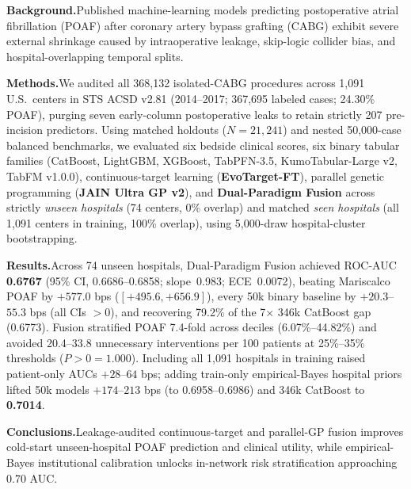\begin{nejmabstract}
\noindent\textbf{Background.}\hspace{0.4em}Published machine-learning models predicting postoperative atrial fibrillation (POAF) after coronary artery bypass grafting (CABG) exhibit severe external shrinkage caused by intraoperative leakage, skip-logic collider bias, and hospital-overlapping temporal splits.

\smallskip\noindent\textbf{Methods.}\hspace{0.4em}We audited all 368,132 isolated-CABG procedures across 1,091 U.S.\ centers in STS ACSD v2.81 (2014--2017; 367,695 labeled cases; 24.30\% POAF), purging seven early-column postoperative leaks to retain strictly 207 pre-incision predictors. Using matched holdouts ($N=21{,}241$) and nested 50,000-case balanced benchmarks, we evaluated six bedside clinical scores, six binary tabular families (CatBoost, LightGBM, XGBoost, TabPFN-3.5, KumoTabular-Large v2, TabFM v1.0.0), continuous-target learning (\textbf{EvoTarget-FT}), parallel genetic programming (\textbf{JAIN Ultra GP v2}), and \textbf{Dual-Paradigm Fusion} across strictly \emph{unseen hospitals} (74 centers, 0\% overlap) and matched \emph{seen hospitals} (all 1,091 centers in training, 100\% overlap), using 5,000-draw hospital-cluster bootstrapping.

\smallskip\noindent\textbf{Results.}\hspace{0.4em}Across 74 unseen hospitals, Dual-Paradigm Fusion achieved ROC-AUC \textbf{0.6767} (95\% CI, 0.6686--0.6858; slope~0.983; ECE~0.0072), beating Mariscalco POAF by $+577.0$ bps ($[+495.6, +656.9]$), every 50k binary baseline by $+20.3$--$55.3$ bps (all CIs $>0$), and recovering 79.2\% of the 7$\times$ 346k CatBoost gap (0.6773). Fusion stratified POAF 7.4-fold across deciles (6.07\%--44.82\%) and avoided 20.4--33.8 unnecessary interventions per 100 patients at 25\%--35\% thresholds ($P>0=1.000$). Including all 1,091 hospitals in training raised patient-only AUCs $+28$--$64$ bps; adding train-only empirical-Bayes hospital priors lifted 50k models $+174$--$213$ bps (to 0.6958--0.6986) and 346k CatBoost to \textbf{0.7014}.

\smallskip\noindent\textbf{Conclusions.}\hspace{0.4em}Leakage-audited continuous-target and parallel-GP fusion improves cold-start unseen-hospital POAF prediction and clinical utility, while empirical-Bayes institutional calibration unlocks in-network risk stratification approaching 0.70 AUC.
\end{nejmabstract}
